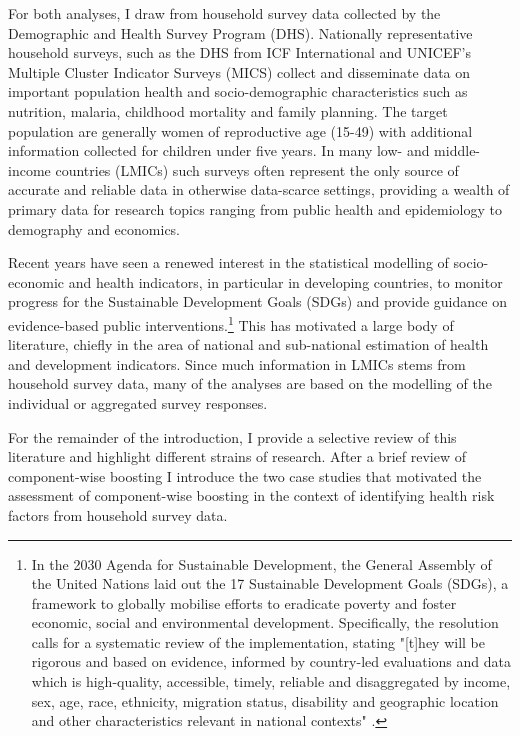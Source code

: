 For both analyses, I draw from household survey data collected by the Demographic and Health Survey Program (DHS). Nationally representative household surveys, such as the DHS from ICF International and UNICEF's Multiple Cluster Indicator Surveys (MICS) collect and disseminate data on important population health and socio-demographic characteristics such as nutrition, malaria, childhood mortality and family planning. The target population are generally women of reproductive age (15-49) with additional information collected for children under five years. In many low- and middle-income countries (LMICs) such surveys often represent the only source of accurate and reliable data in otherwise data-scarce settings, providing a wealth of primary data for research topics ranging from public health and epidemiology to demography and economics.

Recent years have seen a renewed interest in the statistical modelling of socio-economic and health indicators, in particular in developing countries, to monitor progress for the Sustainable Development Goals (SDGs) and provide guidance on evidence-based public interventions.\footnote{In the 2030 Agenda for Sustainable Development, the General Assembly of the United Nations laid out the 17 Sustainable Development Goals (SDGs), a framework to globally mobilise efforts to eradicate poverty and foster economic, social and environmental development. Specifically, the resolution calls for a systematic review of the implementation, stating "[t]hey will be rigorous and based on evidence, informed by country-led evaluations and data which is high-quality, accessible, timely, reliable and disaggregated by income, sex, age, race, ethnicity, migration status, disability and geographic location and other characteristics relevant in national contexts" \autocite[p. 32]{unitednationsGeneralAssemblyResolution2015}.} This has motivated a large body of literature, chiefly in the area of national and sub-national estimation of health and development indicators. Since much information in LMICs stems from household survey data, many of the analyses are based on the modelling of the individual or aggregated survey responses.  

For the remainder of the introduction, I provide a selective review of this literature and highlight different strains of research. After a brief review of component-wise boosting I introduce the two case studies that motivated the assessment of component-wise boosting in the context of identifying health risk factors from household survey data. 


